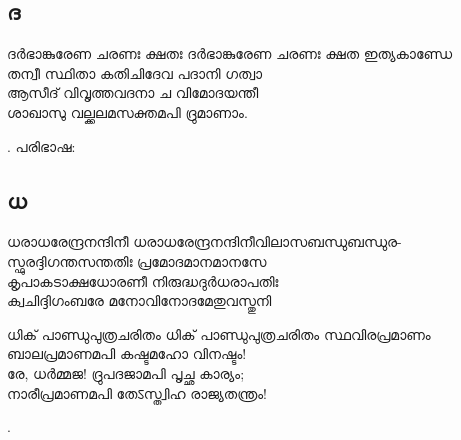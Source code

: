 \subsection{ദ}

\begin{enumerate}


\begin{slokam}{\VVt}{\KD}{ദർഭാങ്കുരേണ ചരണഃ ക്ഷതഃ}
ദർഭാങ്കുരേണ ചരണഃ ക്ഷത ഇത്യകാണ്ഡേ \\
തന്വീ സ്ഥിതാ കതിചിദേവ പദാനി ഗത്വാ \\
ആസീദ് വിവൃത്തവദനാ ച വിമോദയന്തീ \\
ശാഖാസു വല്ക്കലമസക്തമപി ദ്രുമാണാം. 
\end{slokam}


.  പരിഭാഷ: 


\end{enumerate}




\subsection{ധ}

\begin{enumerate}

\begin{slokam}{\VPc}{\Rav}{ധരാധരേന്ദ്രനന്ദിനീ}
 ധരാധരേന്ദ്രനന്ദിനീവിലാസബന്ധുബന്ധുര-\\
സ്ഫുരദ്ദിഗന്തസന്തതിഃ പ്രമോദമാനമാനസേ\\
കൃപാകടാക്ഷധോരണീ നിരുദ്ധദുർധരാപതിഃ\\
ക്വചിദ്ദിഗംബരേ മനോവിനോദമേതുവസ്തുനി
\end{slokam}


\begin{slokam}{\VVt}{\Melp}{ധിക്‌ പാണ്ഡുപുത്രചരിതം}
 ധിക്‌ പാണ്ഡുപുത്രചരിതം സ്ഥവിരപ്രമാണം\\
ബാലപ്രമാണമപി കഷ്ടമഹോ വിനഷ്ടം!\\
രേ, ധർമ്മജ! ദ്രുപദജാമപി പൃച്ഛ കാര്യം;\\
നാരീപ്രമാണമപി തേऽസ്ത്വിഹ രാജ്യതന്ത്രം!

\end{slokam}


.

\end{enumerate}




